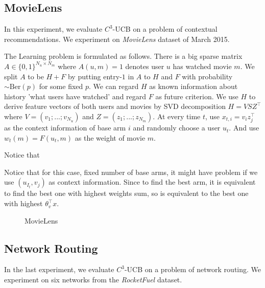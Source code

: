 \documentclass{article}
\begin{document}
\subsection{MovieLens}

In this experiment, we evaluate $C^3$-UCB on a problem of contextual recommendations. We experiment on {\it MovieLens} dataset\cite{lam2013movie} of March 2015.

The Learning problem is formulated as follows. There is a big sparse matrix $A \in \{0,1\}^{N_u \times N_m}$ where $A(u,m) = 1$ denotes user $u$ has watched movie $m$. We split $A$ to be $H + F$ by putting entry-$1$ in $A$ to $H$ and $F$ with probability $\sim \mathrm{Ber}(p)$ for some fixed $p$. We can regard $H$ as known information about history 'what users have watched' and regard $F$ as future criterion. We use $H$ to derive feature vectors of both users and movies by SVD decomposition $H = VSZ^{\top}$ where $V = (v_1; ...;v_{N_u})$ and $Z = (z_1;...;z_{N_m})$. At every time $t$, use $x_{t,i} = v_{i}z_j^{\top}$ as the context information of base arm $i$ and randomly choose a user $u_t$. And use $w_t(m) = F(u_t,m)$ as the weight of movie $m$.

Notice that 

Notice that for this case, fixed number of base arms, it might have problem if we use $(u_{I_t}, v_j)$ as context information.
Since to find the best arm, it is equivalent to find the best one with highest weights sum, so is equivalent to the best one with highest $\theta_{v}^{\top}x$.

\begin{figure}
	\centering
	\caption{MovieLens}
	\label{fig:movielens} %
\end{figure}

\subsection{Network Routing}

In the last experiment, we evaluate $C^3$-UCB on a problem of network routing. We experiment on six networks from the {\it RocketFuel} dataset\cite{spring2004measuring}.
\end{document}
